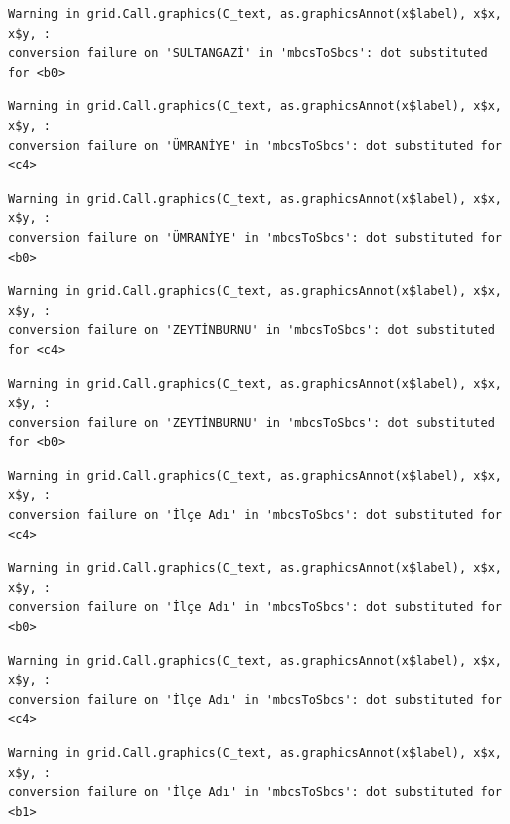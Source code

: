 \documentclass[
  11pt,
  a4paper,
  DIV=11,
  numbers=noendperiod]{scrartcl}
\begin{document}
\begin{verbatim}
Warning in grid.Call.graphics(C_text, as.graphicsAnnot(x$label), x$x, x$y, :
conversion failure on 'SULTANGAZİ' in 'mbcsToSbcs': dot substituted for <b0>
\end{verbatim}

\begin{verbatim}
Warning in grid.Call.graphics(C_text, as.graphicsAnnot(x$label), x$x, x$y, :
conversion failure on 'ÜMRANİYE' in 'mbcsToSbcs': dot substituted for <c4>
\end{verbatim}

\begin{verbatim}
Warning in grid.Call.graphics(C_text, as.graphicsAnnot(x$label), x$x, x$y, :
conversion failure on 'ÜMRANİYE' in 'mbcsToSbcs': dot substituted for <b0>
\end{verbatim}

\begin{verbatim}
Warning in grid.Call.graphics(C_text, as.graphicsAnnot(x$label), x$x, x$y, :
conversion failure on 'ZEYTİNBURNU' in 'mbcsToSbcs': dot substituted for <c4>
\end{verbatim}

\begin{verbatim}
Warning in grid.Call.graphics(C_text, as.graphicsAnnot(x$label), x$x, x$y, :
conversion failure on 'ZEYTİNBURNU' in 'mbcsToSbcs': dot substituted for <b0>
\end{verbatim}

\begin{verbatim}
Warning in grid.Call.graphics(C_text, as.graphicsAnnot(x$label), x$x, x$y, :
conversion failure on 'İlçe Adı' in 'mbcsToSbcs': dot substituted for <c4>
\end{verbatim}

\begin{verbatim}
Warning in grid.Call.graphics(C_text, as.graphicsAnnot(x$label), x$x, x$y, :
conversion failure on 'İlçe Adı' in 'mbcsToSbcs': dot substituted for <b0>
\end{verbatim}

\begin{verbatim}
Warning in grid.Call.graphics(C_text, as.graphicsAnnot(x$label), x$x, x$y, :
conversion failure on 'İlçe Adı' in 'mbcsToSbcs': dot substituted for <c4>
\end{verbatim}

\begin{verbatim}
Warning in grid.Call.graphics(C_text, as.graphicsAnnot(x$label), x$x, x$y, :
conversion failure on 'İlçe Adı' in 'mbcsToSbcs': dot substituted for <b1>
\end{verbatim}
\end{document}

